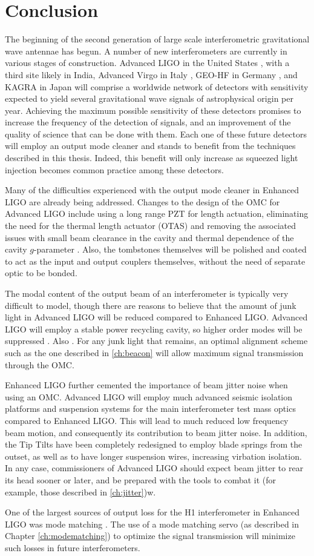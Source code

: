 \chapter{Conclusion}
\label{ch:conclusion}

The beginning of the second generation of large scale interferometric gravitational wave antennae has begun. %
A number of new interferometers are currently in various stages of construction. %
Advanced LIGO in the United States , with a third site likely in India, Advanced Virgo in Italy , GEO-HF in Germany , and KAGRA in Japan  will comprise a worldwide network of detectors with sensitivity expected to yield several gravitational wave signals of astrophysical origin per year. %
Achieving the maximum possible sensitivity of these detectors promises to increase the frequency of the detection of signals, and an improvement of the quality of science that can be done with them. %
Each one of these future detectors will employ an output mode cleaner and stands to benefit from the techniques described in this thesis. %
Indeed, this benefit will only increase as squeezed light injection becomes common practice among these detectors.

Many of the difficulties experienced with the output mode cleaner in Enhanced LIGO are already being addressed. %
Changes to the design of the OMC for Advanced LIGO include using a long range PZT for length actuation, eliminating the need for the thermal length actuator (OTAS) and removing the associated issues with small beam clearance in the cavity and thermal dependence of the cavity $g$-parameter \cite{T1000276,T0900157}. %
Also, the tombstones themselves will be polished and coated to act as the input and output couplers themselves, without the need of separate optic to be bonded. %
 

The modal content of the output beam of an interferometer is typically very difficult to model, though there are reasons to believe that the amount of junk light in Advanced LIGO will be reduced compared to Enhanced LIGO. %
Advanced LIGO will employ a stable power recycling cavity, so higher order modes will be suppressed \cite{T080208}. %
Also . %
For any junk light that remains, an optimal alignment scheme such as the one described in \ref{ch:beacon} will allow maximum signal transmission through the OMC.

Enhanced LIGO further cemented the importance of beam jitter noise when using an OMC. %
Advanced LIGO will employ much advanced seismic isolation platforms \cite{BSCISI} and suspension systems \cite{quaddesign} for the main interferometer test mass optics compared to Enhanced LIGO. %
This will lead to much reduced low frequency beam motion, and consequently its contribution to beam jitter noise. %
In addition, the Tip Tilts have been completely redesigned to employ blade springs from the outset, as well as to have longer suspension wires, increasing virbation isolation. %
In any case, commissioners of Advanced LIGO should expect beam jitter to rear its head sooner or later, and be prepared with the tools to combat it (for example, those described in \ref{ch:jitter})w.

One of the largest sources of output loss for the H1 interferometer in Enhanced LIGO was mode matching \cite{Tobin}. %
The use of a mode matching servo (as described in Chapter \ref{ch:modematching}) to optimize the signal transmission will minimize such losses in future interferometers.


